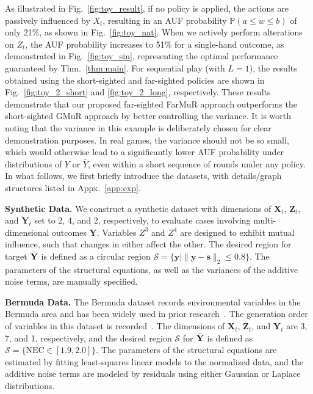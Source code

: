 \documentclass{article}
\theoremstyle{plain}
\theoremstyle{definition}
\theoremstyle{remark}
\def \Fig {Fig.}
\def \Z {\mathbf{Z}}
\def \sS {\mathcal{S}}
\def \X {\mathbf{X}}
\def \Y {\mathbf{Y}}
\def \s {\mathbf{s}}
\def \y {\mathbf{y}}
\begin{document}
As illustrated in \Fig~\ref{fig:toy_result}, if no policy is applied, the actions are passively influenced by \(X_t\), resulting in an AUF probability \(\mathbb{P}(a \leq w \leq b)\) of only 21\%, as shown in \Fig~\ref{fig:toy_nat}. When we actively perform alterations on \(Z_t\), the AUF probability increases to 51\% for a single-hand outcome, as demonstrated in \Fig~\ref{fig:toy_sin}, representing the optimal performance guaranteed by Thm.~\ref{thm:main}. 
For sequential play (with \(L=1\)), the results obtained using the short-sighted and far-sighted policies are shown in \Fig~\ref{fig:toy_2_short} and \ref{fig:toy_2_long}, respectively. These results demonstrate that our proposed far-sighted FarMuR approach outperforms the short-sighted GMuR approach by better controlling the variance. 
It is worth noting that the variance in this example is deliberately chosen for clear demonstration purposes. In real games, the variance should not be so small, which would otherwise lead to a significantly lower AUF probability under distributions of \(Y\) or \(\bar{Y}\), even within a short sequence of rounds under any policy.
In what follows, we first briefly introduce the datasets, with details/graph structures listed in Appx.~\ref{app:exp}.

\noindent \textbf{Synthetic Data.} 
We construct a synthetic dataset with dimensions of $\X_t$, $\Z_t$, and $\Y_t$ set to 2, 4, and 2, respectively, to evaluate cases involving multi-dimensional outcomes \(\Y\). 
Variables \(Z^3\) and \(Z^4\) are designed to exhibit mutual influence, such that changes in either affect the other. 
The desired region for target \(\Bar{\Y}\) is defined as a circular region \(\sS = \{\y \mid \|\y - \s\|_2 \leq 0.8\}\). 
The parameters of the structural equations, as well as the variances of the additive noise terms, are manually specified. 

\noindent \textbf{Bermuda Data.}
The Bermuda dataset records environmental variables in the Bermuda area and has been widely used in prior research~\citep{qint2023srm,du2024micns,courtney2017environmental,aglietti2020causal}. 
The generation order of variables in this dataset is recorded~\citep{bermuda_dataset}. 
The dimensions of $\X_t$, $\Z_t$, and $\Y_t$ are 3, 7, and 1, respectively, and the desired region $\sS$ for $\Bar{\Y}$ is defined as $\sS = \{\text{NEC} \in [1.9, 2.0]\}$. 
The parameters of the structural equations are estimated by fitting least-squares linear models to the normalized data, and the additive noise terms are modeled by residuals using either Gaussian or Laplace distributions.
\end{document}
